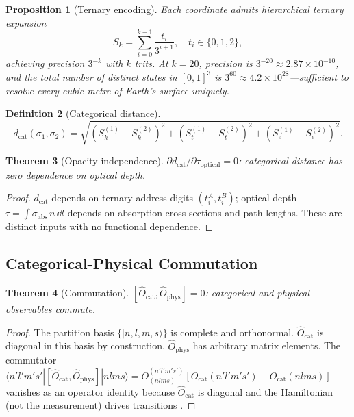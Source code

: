 \documentclass[10pt,twocolumn]{article}
\newtheorem{theorem}{Theorem}[section]
\newtheorem{proposition}[theorem]{Proposition}
\theoremstyle{definition}
\newtheorem{definition}[theorem]{Definition}
\theoremstyle{remark}
\newcommand{\dcat}{d_{\mathrm{cat}}}
\newcommand{\Sk}{S_k}
\newcommand{\St}{S_t}
\newcommand{\Se}{S_e}
\newcommand{\Ocat}{\hat{O}_{\mathrm{cat}}}
\newcommand{\Ophys}{\hat{O}_{\mathrm{phys}}}
\begin{document}
\begin{proposition}[Ternary encoding]\label{prop:ternary}
Each coordinate admits hierarchical ternary expansion
\begin{equation}\label{eq:ternary}
  \Sk = \sum_{i=0}^{k-1}\frac{t_i}{3^{i+1}},
  \quad t_i\in\{0,1,2\},
\end{equation}
achieving precision $3^{-k}$ with $k$ trits.  At $k=20$,
precision is $3^{-20}\approx 2.87\times 10^{-10}$, and the
total number of distinct states in $[0,1]^3$ is $3^{60}\approx
4.2\times 10^{28}$---sufficient to resolve every cubic metre
of Earth's surface uniquely.
\end{proposition}

\begin{definition}[Categorical distance]\label{def:dcat}
\begin{equation}\label{eq:dcat}
  \dcat(\sigma_1,\sigma_2)
  = \sqrt{(\Sk^{(1)}-\Sk^{(2)})^2
    + (\St^{(1)}-\St^{(2)})^2
    + (\Se^{(1)}-\Se^{(2)})^2}.
\end{equation}
\end{definition}

\begin{theorem}[Opacity independence]\label{thm:opacity}
$\partial\dcat/\partial\tau_{\mathrm{optical}}=0$: categorical
distance has zero dependence on optical depth.
\end{theorem}

\begin{proof}
$\dcat$ depends on ternary address digits
$(t_i^A,t_i^B)$; optical depth $\tau=\int\sigma_{\mathrm{abs}}\,
n\,\dd l$ depends on absorption cross-sections and path
lengths.  These are distinct inputs with no functional
dependence.
\end{proof}

\subsection{Categorical-Physical Commutation}
\label{sec:commutation}

\begin{theorem}[Commutation]\label{thm:commutation}
$[\Ocat,\Ophys]=0$: categorical and physical observables
commute.
\end{theorem}

\begin{proof}
The partition basis $\{|n,l,m,s\rangle\}$ is complete and
orthonormal.  $\Ocat$ is diagonal in this basis by
construction.  $\Ophys$ has arbitrary matrix elements.
The commutator
$\langle n'l'm's'|[\Ocat,\Ophys]|nlms\rangle =
O^{(n'l'm's')}_{(nlms)}[O_{\mathrm{cat}}(n'l'm's')
-O_{\mathrm{cat}}(nlms)]$
vanishes as an operator identity because $\Ocat$ is diagonal
and the Hamiltonian (not the measurement) drives transitions
\citep{Braginsky1980,vonNeumann1932}.
\end{proof}
\end{document}
